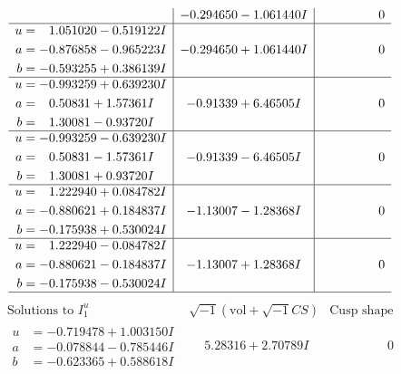 \documentclass[1p]{elsarticle_modified}
\theoremstyle{definition}
\newcommand{\I}{\sqrt{-1}}
\begin{document}
$$\begin{array}{c|c|c}
 & -0.294650 - 1.061440 I & \phantom{-0.000000 } 0 \\ \hline\begin{aligned}
u &= \phantom{-}1.051020 - 0.519122 I \\
a &= -0.876858 - 0.965223 I \\
b &= -0.593255 + 0.386139 I\end{aligned}
 & -0.294650 + 1.061440 I & \phantom{-0.000000 } 0 \\ \hline\begin{aligned}
u &= -0.993259 + 0.639230 I \\
a &= \phantom{-}0.50831 + 1.57361 I \\
b &= \phantom{-}1.30081 - 0.93720 I\end{aligned}
 & -0.91339 + 6.46505 I & \phantom{-0.000000 } 0 \\ \hline\begin{aligned}
u &= -0.993259 - 0.639230 I \\
a &= \phantom{-}0.50831 - 1.57361 I \\
b &= \phantom{-}1.30081 + 0.93720 I\end{aligned}
 & -0.91339 - 6.46505 I & \phantom{-0.000000 } 0 \\ \hline\begin{aligned}
u &= \phantom{-}1.222940 + 0.084782 I \\
a &= -0.880621 + 0.184837 I \\
b &= -0.175938 + 0.530024 I\end{aligned}
 & -1.13007 - 1.28368 I & \phantom{-0.000000 } 0 \\ \hline\begin{aligned}
u &= \phantom{-}1.222940 - 0.084782 I \\
a &= -0.880621 - 0.184837 I \\
b &= -0.175938 - 0.530024 I\end{aligned}
 & -1.13007 + 1.28368 I & \phantom{-0.000000 } 0\\
 \hline 
 \end{array}$$\newpage$$\begin{array}{c|c|c}  
\text{Solutions to }I^u_{1}& \I (\text{vol} + \sqrt{-1}CS) & \text{Cusp shape}\\
 \hline 
\begin{aligned}
u &= -0.719478 + 1.003150 I \\
a &= -0.078844 - 0.785446 I \\
b &= -0.623365 + 0.588618 I\end{aligned}
 & \phantom{-}5.28316 + 2.70789 I & \phantom{-0.000000 } 0 \\ \hline\begin{aligned}

\end{aligned}
\end{array}$$
\end{document}
